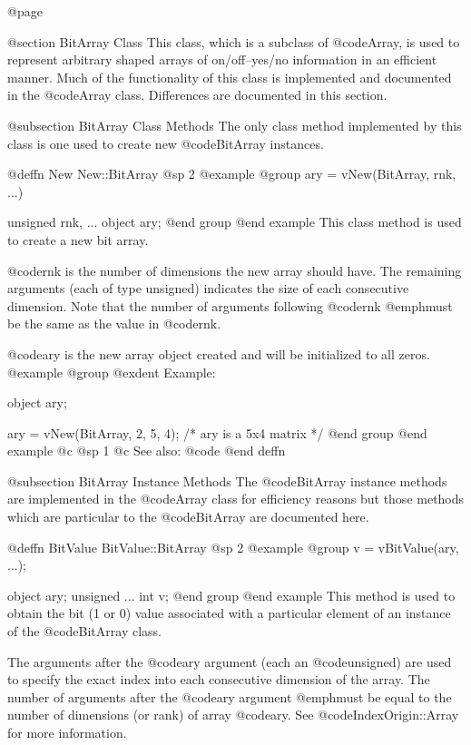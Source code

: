 @page

@section  BitArray Class
This class, which is a subclass of @code{Array}, is used to represent
arbitrary shaped arrays of on/off--yes/no information in an efficient
manner.  Much of the functionality of this class is implemented and
documented in the @code{Array} class.  Differences are documented in
this section.



@subsection BitArray Class Methods
The only class method implemented by this class is one used to create
new @code{BitArray} instances.






@deffn {New} New::BitArray
@sp 2
@example
@group
ary = vNew(BitArray, rnk, ...)

unsigned  rnk, ...
object    ary;
@end group
@end example
This class method is used to create a new bit array.

@code{rnk} is the number of dimensions the new array should have.
The remaining arguments (each of type unsigned) indicates the size of
each consecutive dimension.  Note that the number of arguments following
@code{rnk} @emph{must} be the same as the value in @code{rnk}.

@code{ary} is the new array object created and will be initialized to
all zeros.
@example
@group
@exdent Example:

object  ary;

ary = vNew(BitArray, 2, 5, 4);
/*  ary is a 5x4 matrix  */
@end group
@end example
@c @sp 1
@c See also:  @code{}
@end deffn



@subsection BitArray Instance Methods
The @code{BitArray} instance methods are implemented in the @code{Array} class
for efficiency reasons but those methods which are particular to the
@code{BitArray} are documented here.








@deffn {BitValue} BitValue::BitArray
@sp 2
@example
@group
v = vBitValue(ary, ...);

object    ary;
unsigned  ...
int       v;
@end group
@end example
This method is used to obtain the bit (1 or 0) value associated with a
particular element of an instance of the @code{BitArray} class.

The arguments after the @code{ary} argument (each an @code{unsigned})
are used to specify the exact index into each consecutive dimension of
the array.  The number of arguments after the @code{ary} argument
@emph{must} be equal to the number of dimensions (or rank) of array
@code{ary}.  See @code{IndexOrigin::Array} for more information.

